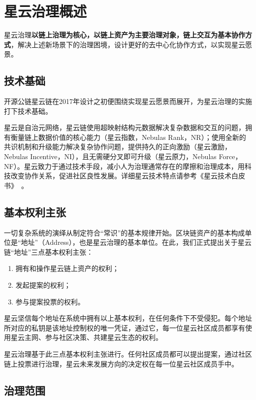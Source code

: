 \section{星云治理概述}

星云治理\textbf{以链上治理为核心，以链上资产为主要治理对象，链上交互为基本协作方式}，解决上述新场景下的治理困境，设计更好的去中心化协作方式，以实现星云愿景。

\subsection{技术基础}

开源公链星云链在2017年设计之初便围绕实现星云愿景而展开，为星云治理的实施打下技术基础。

星云是自治元网络，星云链使用超映射结构元数据解决复杂数据和交互的问题，拥有衡量链上数据价值的核心能力（星云指数，Nebulas Rank，NR）；使用全新的共识机制和升级能力解决复杂协作问题，提供持久的正向激励（星云激励，Nebulas Incentive，NI），且无需硬分叉即可升级（星云原力，Nebulas Force，NF）。星云致力于通过技术手段，减小人为治理通常存在的摩擦和治理成本，用科技改变协作关系，促进社区良性发展。详细星云技术特点请参考《星云技术白皮书》~\cite{TechWhitepaper}。

\subsection{基本权利主张}
\label{rights}

一切复杂系统的演绎从制定符合“常识”的基本规律开始。区块链资产的基本构成单位是“地址”（Address），也是星云治理的基本单位。在此，我们正式提出关于星云链“地址”三点基本权利主张：

\begin{enumerate}
	\item 拥有和操作星云链上资产的权利；
	\item 发起提案的权利；
	\item 参与提案投票的权利。
\end{enumerate}

星云坚信每个地址在系统中拥有以上基本权利，在任何条件下不受侵犯。每个地址所对应的私钥是该地址控制权的唯一凭证，通过它，每一位星云社区成员都享有使用星云主网、参与社区决策、共建星云生态的权利。

星云治理基于此三点基本权利主张进行。任何社区成员都可以提出提案，通过社区链上投票进行治理，星云未来发展方向的决定权在每一位星云社区成员手中。

\subsection{治理范围}

